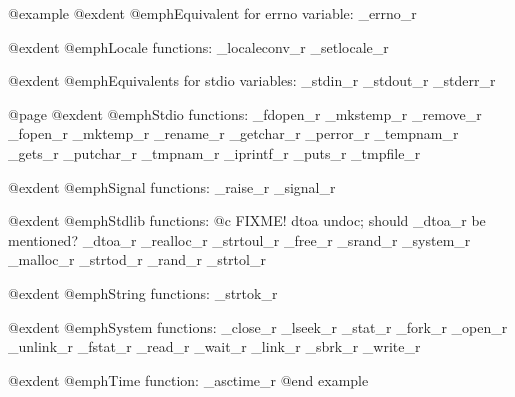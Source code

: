 @example
@exdent @emph{Equivalent for errno variable:}
_errno_r

@exdent @emph{Locale functions:}
_localeconv_r  _setlocale_r

@exdent @emph{Equivalents for stdio variables:}
_stdin_r        _stdout_r       _stderr_r

@page  
@exdent @emph{Stdio functions:}
_fdopen_r       _mkstemp_r       _remove_r
_fopen_r        _mktemp_r        _rename_r
_getchar_r      _perror_r        _tempnam_r
_gets_r         _putchar_r       _tmpnam_r 
_iprintf_r 	_puts_r		 _tmpfile_r

@exdent @emph{Signal functions:}
_raise_r        _signal_r

@exdent @emph{Stdlib functions:}
@c FIXME! dtoa undoc; should _dtoa_r be mentioned?
_dtoa_r         _realloc_r      _strtoul_r
_free_r         _srand_r        _system_r
_malloc_r       _strtod_r
_rand_r         _strtol_r

@exdent @emph{String functions:}
_strtok_r

@exdent @emph{System functions:}
_close_r        _lseek_r        _stat_r
_fork_r         _open_r         _unlink_r
_fstat_r        _read_r         _wait_r
_link_r         _sbrk_r         _write_r

@exdent @emph{Time function:}
_asctime_r
@end example
